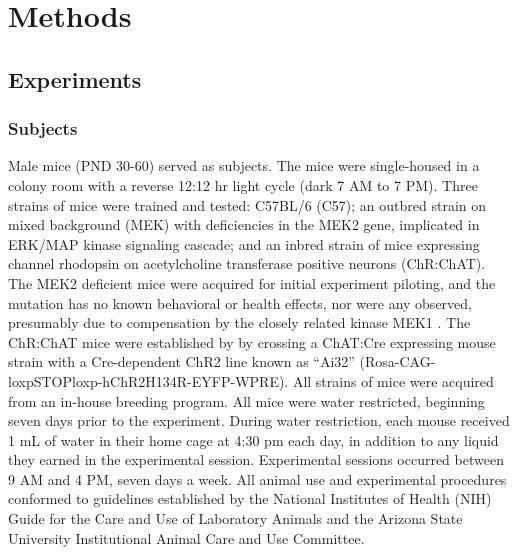 \section*{Methods}
\label{sec:methods}
\subsection*{Experiments}

\subsubsection*{Subjects}
\label{sec:methods_subjects}
Male mice (PND 30-60) served as subjects. The mice were single-housed in a colony room with a reverse 12:12 hr light cycle (dark 7 AM to 7 PM). Three strains of mice were trained and tested: C57BL/6 (C57); an outbred strain on mixed background (MEK) with deficiencies in the MEK2 gene, implicated in ERK/MAP kinase signaling cascade; and an inbred strain of mice expressing channel rhodopsin on acetylcholine transferase positive neurons (ChR:ChAT). The MEK2 deficient mice were acquired for initial experiment piloting, and the mutation has no known behavioral or health effects, nor were any observed, presumably due to compensation by the closely related kinase MEK1 \cite{12832465}. The ChR:ChAT mice were established by by crossing a ChAT:Cre expressing mouse strain with a Cre-dependent ChR2 line known as “Ai32” (Rosa-CAG-loxpSTOPloxp-hChR2H134R-EYFP-WPRE). All strains of mice were acquired from an in-house breeding program. All mice were water restricted, beginning seven days prior to the experiment. During water restriction, each mouse received 1 mL of water in their home cage at 4:30 pm each day, in addition to any liquid they earned in the experimental session. Experimental sessions occurred between 9 AM and 4 PM, seven days a week. All animal use and experimental procedures conformed to guidelines established by the National Institutes of Health (NIH) Guide for the Care and Use of Laboratory Animals and the Arizona State University Institutional Animal Care and Use Committee.